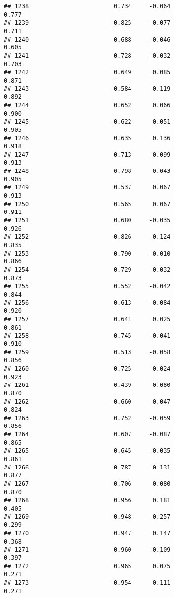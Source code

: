 \documentclass[
]{article}
\begin{document}
\begin{verbatim}
## 1238                        0.734     -0.064                     0.777
## 1239                        0.825     -0.077                     0.711
## 1240                        0.688     -0.046                     0.605
## 1241                        0.728     -0.032                     0.703
## 1242                        0.649      0.085                     0.871
## 1243                        0.584      0.119                     0.892
## 1244                        0.652      0.066                     0.900
## 1245                        0.622      0.051                     0.905
## 1246                        0.635      0.136                     0.918
## 1247                        0.713      0.099                     0.913
## 1248                        0.798      0.043                     0.905
## 1249                        0.537      0.067                     0.913
## 1250                        0.565      0.067                     0.911
## 1251                        0.680     -0.035                     0.926
## 1252                        0.826      0.124                     0.835
## 1253                        0.790     -0.010                     0.866
## 1254                        0.729      0.032                     0.873
## 1255                        0.552     -0.042                     0.844
## 1256                        0.613     -0.084                     0.920
## 1257                        0.641      0.025                     0.861
## 1258                        0.745     -0.041                     0.910
## 1259                        0.513     -0.058                     0.856
## 1260                        0.725      0.024                     0.923
## 1261                        0.439      0.080                     0.870
## 1262                        0.660     -0.047                     0.824
## 1263                        0.752     -0.059                     0.856
## 1264                        0.607     -0.087                     0.865
## 1265                        0.645      0.035                     0.861
## 1266                        0.787      0.131                     0.877
## 1267                        0.706      0.080                     0.870
## 1268                        0.956      0.181                     0.405
## 1269                        0.948      0.257                     0.299
## 1270                        0.947      0.147                     0.368
## 1271                        0.960      0.109                     0.397
## 1272                        0.965      0.075                     0.271
## 1273                        0.954      0.111                     0.271

\end{verbatim}
\end{document}
